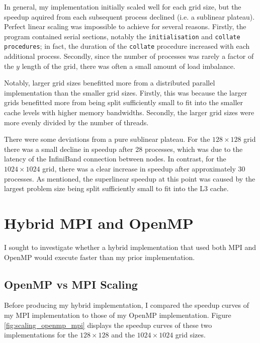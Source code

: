 \documentclass[twocolumn, a4paper]{article}
\begin{document}
In general, my implementation initially scaled well for each grid size, but the speedup aquired from each subsequent process declined (i.e. a sublinear plateau).
Perfect linear scaling was impossible to achieve for several reasons.
Firstly, the program contained serial sections, notably the \texttt{initialisation} and \texttt{collate procedures}; in fact, the duration of the \texttt{collate} procedure increased with each additional process.
Secondly, since the number of processes was rarely a factor of the $y$ length of the grid, there was often a small amount of load imbalance.

Notably, larger grid sizes benefitted more from a distributed parallel implementation than the smaller grid sizes.
Firstly, this was because the larger grids benefitted more from being split sufficiently small to fit into the smaller cache levels with higher memory bandwidths.
Secondly, the larger grid sizes were more evenly divided by the number of threads.

There were some deviations from a pure sublinear plateau.
For the $128\times128$ grid there was a small decline in speedup after 28 processes, which was due to the latency of the InfiniBand connection between nodes.
In contrast, for the $1024\times1024$ grid, there was a clear increase in speedup after approximately 30 processes.
As mentioned, the superlinear speedup at this point was caused by the largest problem size being split sufficiently small to fit into the L3 cache.

\section{Hybrid MPI and OpenMP}

I sought to investigate whether a hybrid implementation that used both MPI and OpenMP would execute faster than my prior implementation.

\subsection{OpenMP vs MPI Scaling}

Before producing my hybrid implementation, I compared the speedup curves of my MPI implementation to those of my OpenMP implementation.
Figure \ref{fig:scaling_openmp_mpi} displays the speedup curves of these two implementations for the $128 \times 128$ and the $1024 \times 1024$ grid sizes.
\end{document}
